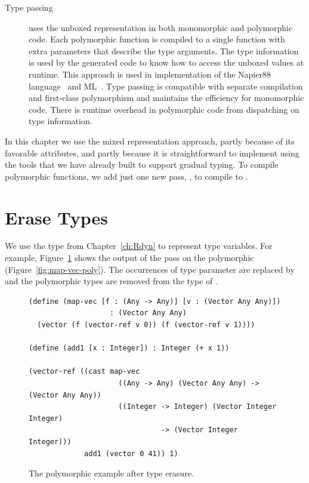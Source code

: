 \documentclass[11pt]{book}
\begin{document}
\begin{description}
\item[Type passing] uses the unboxed representation in both
  monomorphic and polymorphic code. Each polymorphic function is
  compiled to a single function with extra parameters that describe
  the type arguments. The type information is used by the generated
  code to know how to access the unboxed values at runtime. This
  approach is used in implementation of the Napier88
  language~\citep{Morrison:1991aa} and ML~\citep{Harper:1995um}.  Type
  passing is compatible with separate compilation and first-class
  polymorphism and maintains the efficiency for monomorphic
  code. There is runtime overhead in polymorphic code from dispatching
  on type information.
\end{description}

In this chapter we use the mixed representation approach, partly
because of its favorable attributes, and partly because it is
straightforward to implement using the tools that we have already
built to support gradual typing. To compile polymorphic functions, we
add just one new pass, , to compile \LangInst{} to
\LangCast{}.

\section{Erase Types}
\label{sec:erase-types}

We use the  type from Chapter~\ref{ch:Rdyn} to
represent type variables. For example, Figure~\ref{fig:map-vec-erase}
shows the output of the  pass on the polymorphic
 (Figure~\ref{fig:map-vec-poly}). The occurrences of
type parameter  are replaced by  and the polymorphic
 types are removed from the type of . 

\begin{figure}[tbp]
\begin{lstlisting}
(define (map-vec [f : (Any -> Any)] [v : (Vector Any Any)])
                   : (Vector Any Any)
  (vector (f (vector-ref v 0)) (f (vector-ref v 1))))

(define (add1 [x : Integer]) : Integer (+ x 1))

(vector-ref ((cast map-vec
                     ((Any -> Any) (Vector Any Any) -> (Vector Any Any))  
                     ((Integer -> Integer) (Vector Integer Integer)
                               -> (Vector Integer Integer)))
             add1 (vector 0 41)) 1)
\end{lstlisting}
\caption{The polymorphic  example after type erasure.}
\label{fig:map-vec-erase}
\end{figure}
\end{document}
